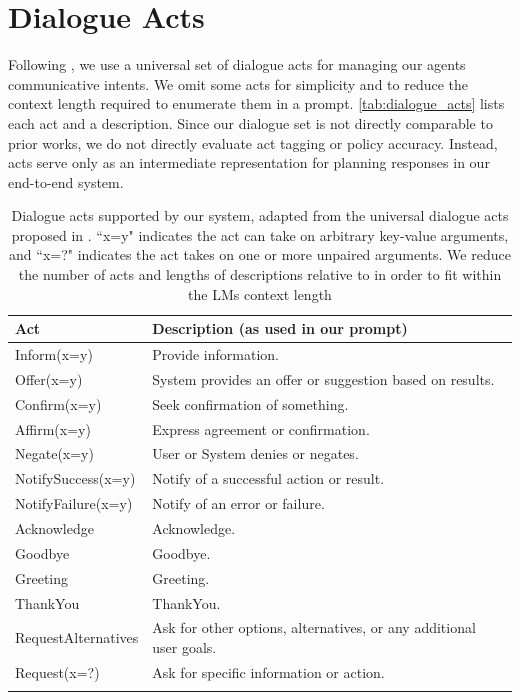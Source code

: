 \documentclass[11pt]{article}
\begin{document}
\section{Dialogue Acts}
\label{app:dialogue_acts}

Following \citet{paul19b_interspeech}, we use a universal set of dialogue acts for managing our agents communicative intents. We omit some acts for simplicity and to reduce the context length required to enumerate them in a prompt. \autoref{tab:dialogue_acts} lists each act and a description. Since our dialogue set is not directly comparable to prior works, we do not directly evaluate act tagging or policy accuracy. Instead, acts serve only as an intermediate representation for planning responses in our end-to-end system.

\begin{table}[]
    \centering
    \begin{tabular}{l p{12cm}}
        \textbf{Act} & \textbf{Description (as used in our prompt)} \\
        \hline
         Inform(x=y) &  Provide information. \\
         Offer(x=y) &  System provides an offer or suggestion based on results. \\
         Confirm(x=y) &  Seek confirmation of something. \\
         Affirm(x=y) &  Express agreement or confirmation. \\
         Negate(x=y) & User or System denies or negates. \\
         NotifySuccess(x=y) & Notify of a successful action or result. \\
         NotifyFailure(x=y) & Notify of an error or failure. \\
         Acknowledge & Acknowledge. \\
         Goodbye & Goodbye. \\
         Greeting & Greeting. \\
         ThankYou & ThankYou. \\
         RequestAlternatives & Ask for other options, alternatives, or any additional user goals. \\
         Request(x=?) & Ask for specific information or action. \\
         
         & 
    \end{tabular}
    \caption{Dialogue acts supported by our system, adapted from the universal dialogue acts proposed in \citet{paul19b_interspeech}. ``x=y" indicates the act can take on arbitrary key-value arguments, and ``x=?" indicates the act takes on one or more unpaired arguments. We reduce the number of acts and lengths of descriptions relative to \citet{paul19b_interspeech} in order to fit within the LMs context length}
    \label{tab:dialogue_acts}
\end{table}
\end{document}
